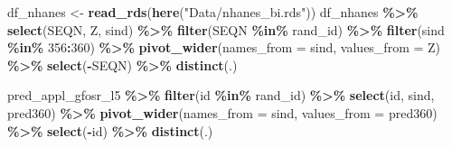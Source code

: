 \documentclass[
]{article}
\newenvironment{Shaded}{\begin{snugshade}}{\end{snugshade}}
\newcommand{\AttributeTok}[1]{\textcolor[rgb]{0.13,0.29,0.53}{#1}}
\newcommand{\DecValTok}[1]{\textcolor[rgb]{0.00,0.00,0.81}{#1}}
\newcommand{\FunctionTok}[1]{\textcolor[rgb]{0.13,0.29,0.53}{\textbf{#1}}}
\newcommand{\NormalTok}[1]{#1}
\newcommand{\OtherTok}[1]{\textcolor[rgb]{0.56,0.35,0.01}{#1}}
\newcommand{\SpecialCharTok}[1]{\textcolor[rgb]{0.81,0.36,0.00}{\textbf{#1}}}
\newcommand{\StringTok}[1]{\textcolor[rgb]{0.31,0.60,0.02}{#1}}
\begin{document}
\begin{Shaded}
\begin{Highlighting}[]
\NormalTok{df\_nhanes }\OtherTok{\textless{}{-}} \FunctionTok{read\_rds}\NormalTok{(}\FunctionTok{here}\NormalTok{(}\StringTok{"Data/nhanes\_bi.rds"}\NormalTok{))}
\NormalTok{df\_nhanes }\SpecialCharTok{\%\textgreater{}\%} 
  \FunctionTok{select}\NormalTok{(SEQN, Z, sind) }\SpecialCharTok{\%\textgreater{}\%}
  \FunctionTok{filter}\NormalTok{(SEQN }\SpecialCharTok{\%in\%}\NormalTok{ rand\_id) }\SpecialCharTok{\%\textgreater{}\%}
  \FunctionTok{filter}\NormalTok{(sind }\SpecialCharTok{\%in\%} \DecValTok{356}\SpecialCharTok{:}\DecValTok{360}\NormalTok{) }\SpecialCharTok{\%\textgreater{}\%}
  \FunctionTok{pivot\_wider}\NormalTok{(}\AttributeTok{names\_from =}\NormalTok{ sind, }\AttributeTok{values\_from =}\NormalTok{ Z) }\SpecialCharTok{\%\textgreater{}\%} 
  \FunctionTok{select}\NormalTok{(}\SpecialCharTok{{-}}\NormalTok{SEQN) }\SpecialCharTok{\%\textgreater{}\%} \FunctionTok{distinct}\NormalTok{(.)}


\NormalTok{pred\_appl\_gfosr\_l5 }\SpecialCharTok{\%\textgreater{}\%} 
  \FunctionTok{filter}\NormalTok{(id }\SpecialCharTok{\%in\%}\NormalTok{ rand\_id) }\SpecialCharTok{\%\textgreater{}\%}
  \FunctionTok{select}\NormalTok{(id, sind, pred360) }\SpecialCharTok{\%\textgreater{}\%}
  \FunctionTok{pivot\_wider}\NormalTok{(}\AttributeTok{names\_from =}\NormalTok{ sind, }\AttributeTok{values\_from =}\NormalTok{ pred360) }\SpecialCharTok{\%\textgreater{}\%} 
  \FunctionTok{select}\NormalTok{(}\SpecialCharTok{{-}}\NormalTok{id) }\SpecialCharTok{\%\textgreater{}\%} \FunctionTok{distinct}\NormalTok{(.)}
\end{Highlighting}
\end{Shaded}
\end{document}

